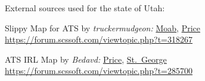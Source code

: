 











\vspace{2em}\footnoterule
{\footnotesize \noindent External sources used for the state of Utah:
\begin{description}[
	style=nextline,
	leftmargin=1.1em,
	labelsep=0pt,
	parsep=0pt,
	font=\normalfont,
]

\item[$\ast$]
Slippy Map for ATS by \textit{truckermudgeon:}
\hyperref[city:Moab]{Moab},
\hyperref[city:Price]{Price}
\url{https://forum.scssoft.com/viewtopic.php?t=318267}

\item[$\dagger$]
ATS IRL Map by \textit{Bedavd:}
\hyperref[city:Price]{Price},
\hyperref[city:st_george]{St.\ George}
\url{https://forum.scssoft.com/viewtopic.php?t=285700}

\end{description}
}
